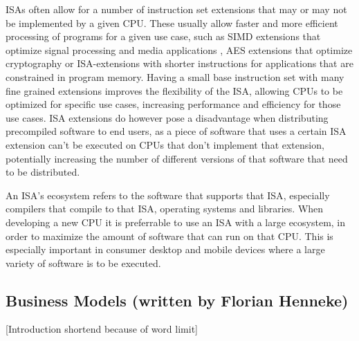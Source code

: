 \documentclass[conference]{IEEEtran}
\begin{document}
\glspl{ISA} often allow for a number of instruction set extensions that may or may not be implemented by a given \gls{CPU}. These usually allow
faster and more efficient processing of programs for a given use case, such as \gls{SIMD} extensions that optimize signal processing and media applications \cite[page 52]{Arm2020},
\gls{AES} extensions that optimize cryptography \cite{Arm2015} or \gls{ISA}-extensions with shorter instructions for applications that are constrained in program memory. \cite{Arm2005}
Having a small base instruction set with many fine grained extensions improves the flexibility of the \gls{ISA}, allowing \glspl{CPU} to be optimized for specific
use cases, increasing performance and efficiency for those use cases. \gls{ISA} extensions do however pose a disadvantage when distributing precompiled software
to end users, as a piece of software that uses a certain \gls{ISA} extension can't be executed on \glspl{CPU} that don't implement that extension, potentially
increasing the number of different versions of that software that need to be distributed.

An \gls{ISA}'s ecosystem refers to the software that supports that \gls{ISA}, especially compilers that compile to that \gls{ISA}, operating systems and libraries.
When developing a new \gls{CPU} it is preferrable to use an \gls{ISA} with a large ecosystem, in order to maximize the amount of software
that can run on that \gls{CPU}. This is especially important in consumer desktop and mobile devices where a large variety of software is to be executed.

	\subsection{Business Models (written by Florian Henneke)}
	\label{businessModels}
	[Introduction shortend because of word limit]
\end{document}
